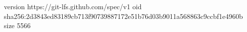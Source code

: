 version https://git-lfs.github.com/spec/v1
oid sha256:2d3843ed83189cb713f90739887172e51b76d03b9011a568863c9ccbf1e4960b
size 5566
